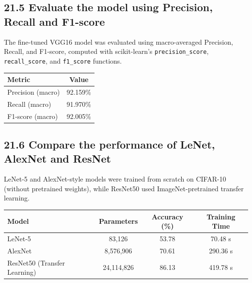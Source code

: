 \documentclass[11pt]{article}
\begin{document}
\vspace{5mm}

\subsection*{21.5 Evaluate the model using Precision, Recall and F1-score}

The fine-tuned VGG16 model was evaluated using macro-averaged Precision, Recall, and F1-score, computed with scikit-learn's \texttt{precision\_score}, \texttt{recall\_score}, and \texttt{f1\_score} functions.

\begin{center}

\begin{tabular}{|l|c|}

\hline

Metric & Value\\

\hline

Precision (macro) & 92.159\%\\

\hline

Recall (macro) & 91.970\%\\

\hline

F1-score (macro) & 92.005\%\\

\hline

\end{tabular}

\end{center}

\vspace{5mm}

\subsection*{21.6 Compare the performance of LeNet, AlexNet and ResNet}

LeNet-5 and AlexNet-style models were trained from scratch on CIFAR-10 (without pretrained weights), while ResNet50 used ImageNet-pretrained transfer learning.

\begin{center}

\begin{tabular}{|l|c|c|c|}

\hline

Model & Parameters & Accuracy (\%) & Training Time\\

\hline

LeNet-5 & 83,126 & 53.78 & 70.48 s\\

\hline

AlexNet & 8,576,906 & 70.61 & 290.36 s\\

\hline

ResNet50 (Transfer Learning) & 24,114,826 & 86.13 & 419.78 s\\

\hline

\end{tabular}

\end{center}
\end{document}
